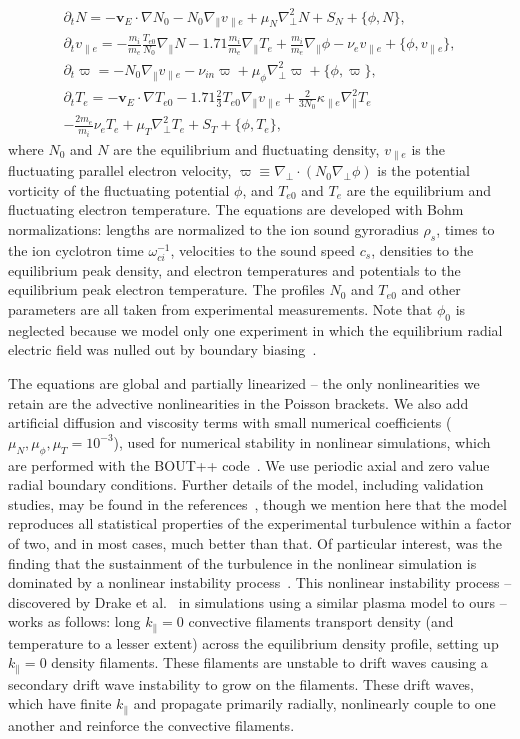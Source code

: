 \documentclass[showpacs,preprintnumbers,amsmath,amssymb,superscriptaddress,aip]{revtex4-1}
\def\beqar{\begin{eqnarray}}
\def\eeqar{\end{eqnarray}}
\def\para{\parallel}
\newcommand{\pdt}{\partial_t}
\def\grad{\nabla}
\newcommand{\gradpar}{\grad_\parallel}
\newcommand{\gradperp}{\grad_\perp}
\newcommand{\vpe}{v_{\parallel e}}
\newcommand{\nue}{\nu_{e}}
\newcommand{\nuin}{\nu_{in}}
\newcommand{\kpe}{\kappa_{\parallel e}}
\newcommand{\fmie}{\frac{m_i}{m_e}}
\begin{document}
\beqar
\label{ni_eq}
\pdt N = - {\mathbf v_E} \cdot \grad N_0 - N_0 \gradpar \vpe + \mu_N \gradperp^2 N + S_N + \{\phi,N\}, \\
\label{ve_eq}
\pdt \vpe = - \fmie \frac{T_{e0}}{N_0} \gradpar N - 1.71 \fmie \gradpar T_e  + \fmie \gradpar \phi - \nue \vpe + \{\phi,\vpe \}, \\
\label{rho_eq}
\pdt \varpi = - N_0 \gradpar \vpe  - \nuin \varpi + \mu_\phi \gradperp^2 \varpi + \{\phi,\varpi \}, \\
\label{te_eq}
\pdt T_e = - {\mathbf v_E} \cdot \grad T_{e0} - 1.71 \frac{2}{3} T_{e0} \gradpar \vpe + \frac{2}{3 N_0} \kpe \gradpar^2 T_e  \nonumber \\
- \frac{2 m_e}{m_i} \nue T_e  + \mu_T \gradperp^2 T_e +  S_T + \{\phi,T_e\},
\eeqar
where $N_0$ and $N$ are the equilibrium and fluctuating density, $\vpe$ is the fluctuating parallel electron velocity, $\varpi \equiv \gradperp \cdot (N_0 \gradperp \phi)$ is the potential vorticity
of the fluctuating potential $\phi$, and $T_{e0}$ and $T_e$ are the equilibrium and fluctuating electron temperature. The equations are developed with Bohm normalizations: lengths are
normalized to the ion sound gyroradius $\rho_s$, times to the ion cyclotron time $\omega_{ci}^{-1}$, velocities to the sound speed $c_s$, densities to the equilibrium peak density, and electron
temperatures and potentials to the equilibrium peak electron temperature. The profiles $N_0$ and $T_{e0}$ and other parameters are all taken from experimental measurements. Note that $\phi_0$ is
neglected because we model only one experiment in which the equilibrium radial electric field was nulled out by boundary biasing~\cite{schaffner2012}. 

The equations are global and partially linearized -- the only nonlinearities we retain are the advective nonlinearities in the Poisson brackets. 
We also add artificial diffusion and viscosity terms with small numerical coefficients ($\mu_N, \mu_\phi, \mu_T = 10^{-3}$), 
used for numerical stability in nonlinear simulations, which are performed with the BOUT++ code~\cite{dudson2009}. We use periodic axial and zero value radial 
boundary conditions. Further details of the model, including validation studies, may be found in the references~\cite{Popovich2010a,Popovich2010b,Umansky2011,friedman2012b,friedman2013},
though we mention here that the model reproduces all statistical properties of the experimental turbulence within a factor of two, and in most cases, much better than that.
Of particular interest, was the finding that the sustainment of the turbulence in the nonlinear simulation is dominated by a nonlinear instability process~\cite{friedman2012b,friedman2013}.
This nonlinear instability process -- discovered by Drake et al.~\cite{drake1995} in simulations using a similar plasma model to ours -- works as follows: long $k_\para=0$ convective filaments transport
density (and temperature to a lesser extent) across the equilibrium density profile, setting up $k_\para=0$ density filaments. These filaments are unstable to drift waves causing a secondary drift
wave instability to grow on the filaments. These drift waves, which have finite $k_\para$ and propagate primarily radially, nonlinearly couple to one another and reinforce the convective filaments.
\end{document}
